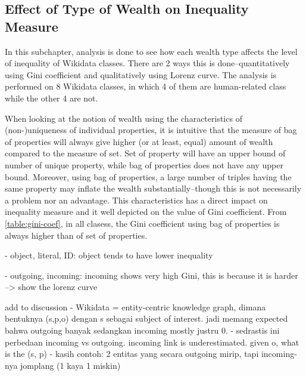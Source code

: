 \subsection{Effect of Type of Wealth on Inequality Measure}

% 
% 
% 

In this subchapter, analysis is done to see how each wealth type affects the level of inequality of Wikidata classes. There are 2 ways this is done--quantitatively using Gini coefficient and qualitatively using Lorenz curve. The analysis is performed on 8 Wikidata classes, in which 4 of them are human-related class while the other 4 are not.

When looking at the notion of wealth using the characteristics of (non-)uniqueness of individual properties, it is intuitive that the measure of bag of properties will always give higher (or at least, equal) amount of wealth compared to the measure of set. Set of property will have an upper bound of number of unique property, while bag of properties does not have any upper bound. Moreover, using bag of properties, a large number of triples having the same property may inflate the wealth substantially--though this is not necessarily a problem nor an advantage. This characteristics has a direct impact on inequality measure and it well depicted on the value of Gini coefficient. From \autoref{table:gini-coef}, in all clasess, the Gini coefficient using bag of properties is always higher than of set of properties.

- object, literal, ID: object tends to have lower inequality

- outgoing, incoming: incoming shows very high Gini, this is because it is harder --> show the lorenz curve

add to discussion 
- Wikidata = entity-centric knowledge graph, dimana bentuknya (s,p,o) dengan s sebagai subject of interest. jadi memang expected bahwa outgoing banyak 
sedangkan incoming mostly justru 0.
- sedrastis ini perbedaan incoming vs outgoing. incoming link is underestimated. given o, what is the (s, p)
- kasih contoh: 2 entitas yang secara outgoing mirip, tapi incoming-nya jomplang (1 kaya 1 miskin)


